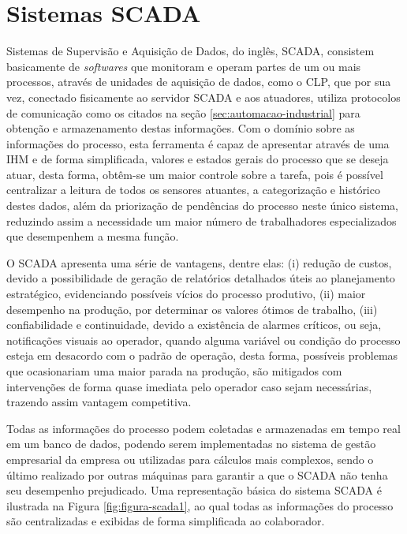 \chapter{Sistemas SCADA}
\label{sec:scada}

    Sistemas de Supervisão e Aquisição de Dados, do inglês, \gls{SCADA}, consistem basicamente de \textit{softwares} que monitoram e operam partes de um ou mais processos, através de unidades de aquisição de dados, como o \gls{CLP}, que por sua vez, conectado fisicamente ao servidor \gls{SCADA} e aos atuadores, utiliza protocolos de comunicação como os citados na seção \ref{sec:automacao-industrial} para obtenção e armazenamento destas informações. Com o domínio sobre as informações do processo, esta ferramenta é capaz de apresentar através de uma \gls{IHM} e de forma simplificada, valores e estados gerais do processo que se deseja atuar, desta forma, obtêm-se um maior controle sobre a tarefa, pois é possível centralizar a leitura de todos os sensores atuantes, a categorização e histórico destes dados, além da priorização de pendências do processo neste único sistema, reduzindo assim a necessidade um maior número de trabalhadores especializados que desempenhem a mesma função. \cite{WhatScada}
    
    O \gls{SCADA} apresenta uma série de vantagens, dentre elas: (i) redução de custos, devido a possibilidade de geração de relatórios detalhados úteis ao planejamento estratégico, evidenciando possíveis vícios do processo produtivo, (ii) maior desempenho na produção, por determinar os valores ótimos de trabalho, (iii) confiabilidade e continuidade, devido a existência de alarmes críticos, ou seja, notificações visuais ao operador, quando alguma variável ou condição do processo esteja em desacordo com o padrão de operação, desta forma, possíveis problemas que ocasionariam uma maior parada na produção, são mitigados com intervenções de forma quase imediata pelo operador caso sejam necessárias, trazendo assim vantagem competitiva.
    
    Todas as informações do processo podem coletadas e armazenadas em tempo real em um banco de dados, podendo serem implementadas no sistema de gestão empresarial da empresa ou utilizadas para cálculos mais complexos, sendo o último realizado por outras máquinas para garantir a que o \gls{SCADA} não tenha seu desempenho prejudicado.
    Uma representação básica do sistema \gls{SCADA} é ilustrada na Figura \ref{fig:figura-scada1}, ao qual todas as informações do processo são centralizadas e exibidas de forma simplificada ao colaborador. 
    
